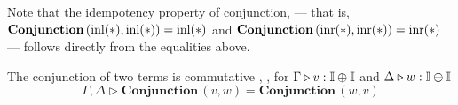  Note that the idempotency property of conjunction, --- that is, $ \textbf{Conjunction} \, (\mathrm{inl}(*), \mathrm{inl}(*)) = \mathrm{inl}(*)$ and  $ \textbf{Conjunction} \, (\mathrm{inr}(*), \mathrm{inr}(*)) = \mathrm{inr}(*)$ ---   follows directly from the equalities above.


\begin{proposition} \label{lem:comm}
  The conjunction of two terms is commutative , \ie, for $ \Gamma \triangleright v: \mathbb{I} \oplus \mathbb{I}$ and $ \Delta \triangleright w: \mathbb{I} \oplus \mathbb{I}$ 
 $$  \Gamma, \Delta \triangleright \textbf{Conjunction} \, (v,w) = \textbf{Conjunction} \, (w,v)  $$ 
\end{proposition}




